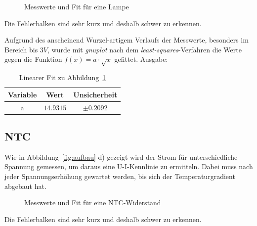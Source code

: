 \begin{figure}[H]
\centering
{}
\caption{Messwerte und Fit für eine Lampe}
\label{fig:Lampe}
\end{figure}
Die Fehlerbalken sind sehr kurz und deshalb schwer zu erkennen.

Aufgrund des anscheinend Wurzel-artigem Verlaufs der Messwerte, besonders im Bereich bis $3V$, wurde mit \emph{gnuplot} nach dem \emph{least-squares}-Verfahren die Werte gegen die Funktion $f(x)=a\cdot\sqrt{x}$ gefittet. Ausgabe:
\begin{table}[H]
  \centering
  \begin{tabular}{c | c | c }
    Variable & Wert & Unsicherheit\\ \hline
    a & $\num{14,9315}$ & $\pm\num{0,2092}$ \\
   
  \end{tabular}
  \caption{Linearer Fit zu Abbildung~\ref{fig:Lampe}}
  \label{tab:fitlampe}
\end{table}
\subsection{NTC}
Wie in Abbildung~\ref{fig:aufbau} d) gezeigt wird der Strom für unterschiedliche Spannung gemessen, um daraus eine U-I-Kennlinie zu ermitteln. Dabei muss nach jeder Spannungserhöhung gewartet werden, bis sich der Temperaturgradient abgebaut hat. 

\begin{figure}[H]
\centering
{}
\caption{Messwerte und Fit für eine NTC-Widerstand}
\label{fig:ntc}
\end{figure}
Die Fehlerbalken sind sehr kurz und deshalb schwer zu erkennen.

